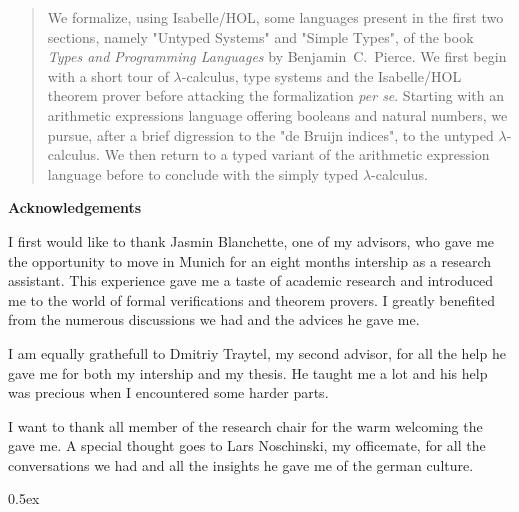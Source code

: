 \documentclass[12pt,a4paper,titlepage,oneside]{article}
\makeatletter
\newcommand\ackname{Acknowledgements}
\newenvironment{acknowledgements}{%
      \titlepage
      \null\vfil
      \@beginparpenalty\@lowpenalty
      \begin{center}%
        \bfseries \ackname
        \@endparpenalty\@M
      \end{center}}%
     {\par\vfil\null\endtitlepage}
\newenvironment{acknowledgements}{%
      \if@twocolumn
        \section*{\abstractname}%
      \else
        \small
        \begin{center}%
          {\bfseries \ackname\vspace{-.5em}\vspace{\z@}}%
        \end{center}%
        \quotation
      \fi}
      {\if@twocolumn\else\endquotation\fi}
\makeatother
\begin{document}
\begin{abstract}
We formalize, using Isabelle/HOL, some languages present in the first two sections, namely "Untyped
Systems" and "Simple Types", of the book \emph{Types and Programming Languages} by
Benjamin~C.~Pierce. We first begin with a short tour of $\lambda$-calculus, type systems and the
Isabelle/HOL theorem prover before attacking the formalization \emph{per se}. Starting with an
arithmetic expressions language offering booleans and natural numbers, we pursue, after a brief
digression to the "de Bruijn indices", to the untyped $\lambda$-calculus. We then return to a typed
variant of the arithmetic expression language before to conclude with the simply typed
$\lambda$-calculus.
\end{abstract}

\begin{acknowledgements}
  I first would like to thank Jasmin Blanchette, one of my advisors, who gave me the opportunity to
  move in Munich for an eight months intership as a research assistant. This experience gave me a
  taste of academic research and introduced me to the world of formal verifications and theorem
  provers. I greatly benefited from the numerous discussions we had and the advices he gave me.

  I am equally grathefull to Dmitriy Traytel, my second advisor, for all the help he gave me for
  both my intership and my thesis. He taught me a lot and his help was precious when I encountered
  some harder parts.

  I want to thank all member of the research chair for the warm welcoming the gave me. A special
  thought goes to Lars Noschinski, my officemate, for all the conversations we had and all the
  insights he gave me of the german culture.
\end{acknowledgements}

\cleardoublepage
\tableofcontents

\cleardoublepage
{}
\pagestyle{headings}





\parindent 0pt\parskip 0.5ex










\nocite{*}



%
%
\end{document}
